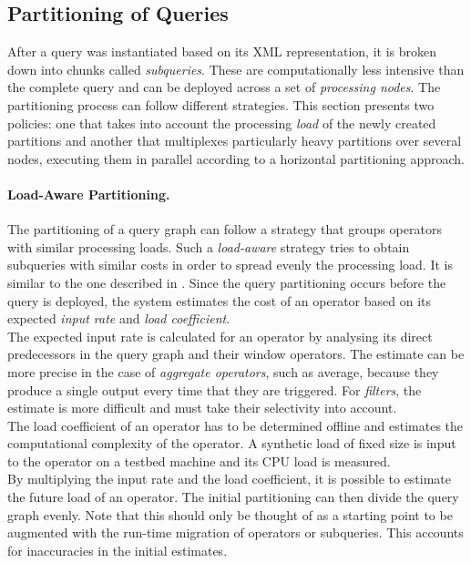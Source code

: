 \subsection{Partitioning of Queries}
\label{sec:qpart}
After a query was instantiated based on its XML representation, it is broken down into chunks called
\emph{subqueries}. These are computationally less intensive than the complete query and can be deployed
across a set of \emph{processing nodes}. The partitioning process can follow different strategies. 
This section presents two policies: one that takes into account the processing
\emph{load} of the newly created partitions and another that multiplexes particularly heavy
partitions over several nodes, executing them in parallel according to a horizontal partitioning
approach.
\vspace{-10pt}
\paragraph*{Load-Aware Partitioning.}
The partitioning of a query graph can follow a strategy that groups operators with similar processing
loads.
Such a \emph{load-aware} strategy tries to obtain subqueries with similar costs in order to spread evenly
the processing load. It is similar to the one described in \cite{borealis-load}.
Since the query partitioning occurs before the query is deployed, the system estimates the cost of an
operator based on its expected \emph{input rate} and \emph{load coefficient}.\\
The expected input rate is calculated for an operator by analysing its direct predecessors in the query
graph and their window operators. The estimate can be more precise in the case of \emph{aggregate
operators}, such as average, because they produce a single output every time that they are triggered. For
\emph{filters}, the estimate is more difficult and must take their selectivity into account. \\ 
The load coefficient of an operator has to be determined offline and estimates the computational
complexity of the operator. A synthetic load of fixed size is input to the operator on a testbed machine
and its CPU load is measured. \\
By multiplying the input rate and the load coefficient, it is possible to
estimate the future load of an operator. The initial partitioning can then divide the query graph
evenly. Note that this should only be thought of as a starting point to be augmented with the run-time
migration of operators or subqueries. This accounts for inaccuracies in the initial estimates. 
\vspace{-10pt}
